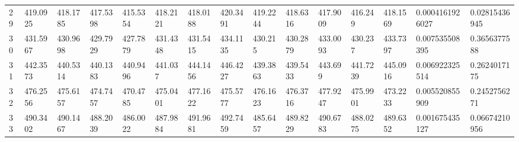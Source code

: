 \begin{landscape}
{\begin{longtable}{@{}lllllllllllllll@{}}
		29                                           & 419.0925                 & 418.1785                 & 417.5398                 & 415.5354                 & 418.2121                 & 418.0188                 & 420.3491                 & 419.2244                 & 418.6316                 & 417.9009                 & 416.249                  & 418.1569                 & 0.0004161926027                                                        & 0.02815436945                                   \\
		30                                           & 431.5967                 & 430.9698                 & 429.7929                 & 427.7879                 & 431.4348                 & 431.5415                 & 434.1135                 & 430.215                  & 430.2879                 & 433.0093                 & 430.237                  & 433.7397                 & 0.007535508395                                                         & 0.3656377588                                    \\
		31                                           & 442.3573                 & 440.5314                 & 440.1383                 & 440.9496                 & 441.037                  & 444.1456                 & 446.4227                 & 439.3863                 & 439.5433                 & 443.699                  & 441.7239                 & 445.0916                 & 0.006922325514                                                         & 0.2624017175                                    \\
		32                                           & 476.2556                 & 475.6157                 & 474.7457                 & 470.4785                 & 475.0401                 & 477.1622                 & 475.5777                 & 476.1623                 & 476.3716                 & 477.9247                 & 475.9901                 & 473.2233                 & 0.005520855909                                                         & 0.2452756271                                    \\
		33                                           & 490.3402                 & 490.1467                 & 488.2039                 & 486.0022                 & 487.9884                 & 491.9681                 & 492.7459                 & 485.6457                 & 489.8229                 & 490.6783                 & 488.0275                 & 489.6352                 & 0.001675435127                                                         & 0.06674210956                                   \\

\end{longtable}}
\end{landscape}
